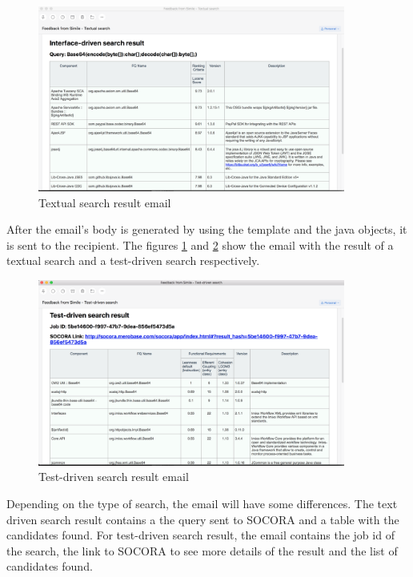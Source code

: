 {\begin{figure}[H]
	\centering
    \includegraphics[width=0.9\textwidth]{grafiken/email-01}
    \caption{Textual search result email}
    \label{fig:email-01}
\end{figure}

After the email's body is generated by using the template and the java objects, it is sent to the recipient. The figures \ref{fig:email-01} and \ref{fig:email-02} show the email with the result of a textual search and a test-driven search respectively.

\begin{figure}[H]
	\centering
    \includegraphics[width=0.9\textwidth]{grafiken/email-02}
    \caption{Test-driven search result email}
    \label{fig:email-02}
\end{figure}

Depending on the type of search, the email will have some differences. The text driven search result contains a the query sent to SOCORA and a table with the candidates found. For test-driven search result, the email contains the job id of the search, the link to SOCORA to see more details of the result and the list of candidates found.

}
